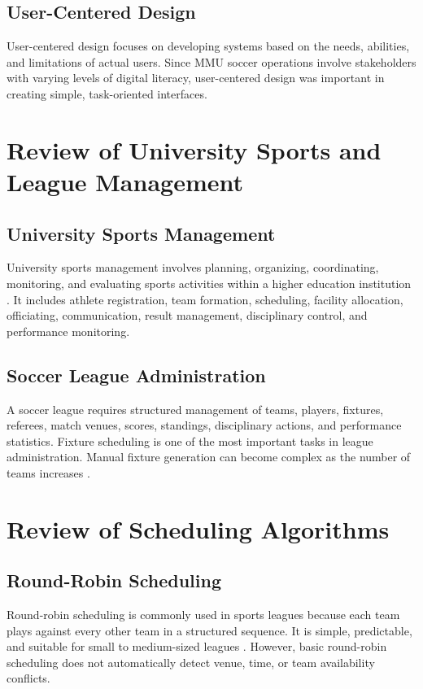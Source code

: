 \documentclass[12pt,a4paper]{report}
\begin{document}
\subsection{User-Centered Design}
User-centered design focuses on developing systems based on the needs, abilities, and
limitations of actual users. Since MMU soccer operations involve stakeholders with varying
levels of digital literacy, user-centered design was important in creating simple,
task-oriented interfaces.

\section{Review of University Sports and League Management}

\subsection{University Sports Management}
University sports management involves planning, organizing, coordinating, monitoring, and
evaluating sports activities within a higher education institution \cite{sarlak2024}. It
includes athlete registration, team formation, scheduling, facility allocation, officiating,
communication, result management, disciplinary control, and performance monitoring.

\subsection{Soccer League Administration}
A soccer league requires structured management of teams, players, fixtures, referees, match
venues, scores, standings, disciplinary actions, and performance statistics. Fixture scheduling
is one of the most important tasks in league administration. Manual fixture generation can
become complex as the number of teams increases \cite{vanbulck2022}.

\section{Review of Scheduling Algorithms}
\subsection{Round-Robin Scheduling}
Round-robin scheduling is commonly used in sports leagues because each team plays against every
other team in a structured sequence. It is simple, predictable, and suitable for small to
medium-sized leagues \cite{ribeiro2010}. However, basic round-robin scheduling does not
automatically detect venue, time, or team availability conflicts.
\end{document}
